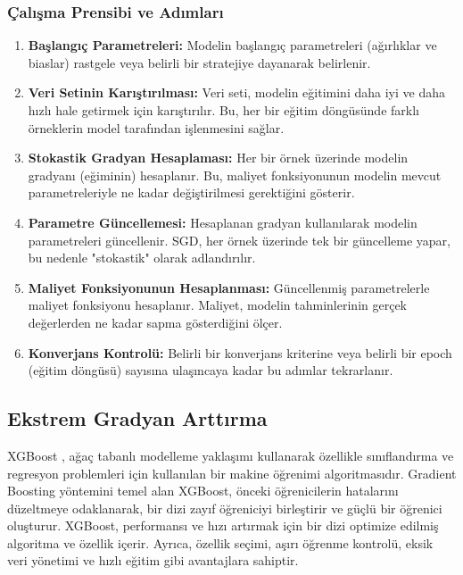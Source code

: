 \subsubsection{Çalışma Prensibi ve Adımları}
\begin{enumerate}
\item \textbf{Başlangıç Parametreleri:} Modelin başlangıç parametreleri (ağırlıklar ve biaslar) rastgele veya belirli bir stratejiye dayanarak belirlenir.
\item \textbf{Veri Setinin Karıştırılması:} Veri seti, modelin eğitimini daha iyi ve daha hızlı hale getirmek için karıştırılır. Bu, her bir eğitim döngüsünde farklı örneklerin model tarafından işlenmesini sağlar.
\item \textbf{Stokastik Gradyan Hesaplaması:} Her bir örnek üzerinde modelin gradyanı (eğiminin) hesaplanır. Bu, maliyet fonksiyonunun modelin mevcut parametreleriyle ne kadar değiştirilmesi gerektiğini gösterir.
\item \textbf{Parametre Güncellemesi:} Hesaplanan gradyan kullanılarak modelin parametreleri güncellenir. SGD, her örnek üzerinde tek bir güncelleme yapar, bu nedenle "stokastik" olarak adlandırılır.
\item \textbf{Maliyet Fonksiyonunun Hesaplanması:} Güncellenmiş parametrelerle maliyet fonksiyonu hesaplanır. Maliyet, modelin tahminlerinin gerçek değerlerden ne kadar sapma gösterdiğini ölçer.
\item \textbf{Konverjans Kontrolü:} Belirli bir konverjans kriterine veya belirli bir epoch (eğitim döngüsü) sayısına ulaşıncaya kadar bu adımlar tekrarlanır.
\end{enumerate}

\subsection{Ekstrem Gradyan Arttırma}
XGBoost , ağaç tabanlı modelleme yaklaşımı kullanarak özellikle sınıflandırma ve regresyon problemleri için kullanılan bir makine öğrenimi algoritmasıdır. Gradient Boosting yöntemini temel alan XGBoost, önceki öğrenicilerin hatalarını düzeltmeye odaklanarak, bir dizi zayıf öğreniciyi birleştirir ve güçlü bir öğrenici oluşturur. XGBoost, performansı ve hızı artırmak için bir dizi optimize edilmiş algoritma ve özellik içerir. Ayrıca, özellik seçimi, aşırı öğrenme kontrolü, eksik veri yönetimi ve hızlı eğitim gibi avantajlara sahiptir. 

